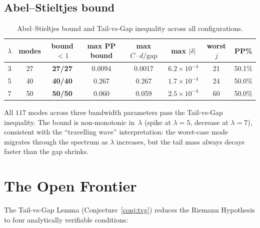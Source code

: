 \documentclass[12pt,a4paper]{article}
\theoremstyle{definition}
\theoremstyle{remark}
\begin{document}
\subsection{Abel--Stieltjes bound}

\begin{table}[h]
\centering
\caption{Abel--Stieltjes bound and Tail-vs-Gap inequality across all
configurations.}
\label{tab:abel}
\begin{tabular}{cccccccc}
\toprule
$\lambda$ & modes & bound $< 1$ & max PP bound & max $C \cdot d / \text{gap}$
  & max $|\delta|$ & worst $j$ & PP\% \\
\midrule
3 & 27 & \textbf{27/27} & 0.0094 & 0.0017 &
  $6.2 \times 10^{-4}$ & 21 & 50.1\% \\
5 & 40 & \textbf{40/40} & 0.267 & 0.267 &
  $1.7 \times 10^{-4}$ & 24 & 50.0\% \\
7 & 50 & \textbf{50/50} & 0.060 & 0.059 &
  $2.5 \times 10^{-4}$ & 60 & 50.0\% \\
\bottomrule
\end{tabular}
\end{table}

All $117$ modes across three bandwidth parameters pass the
Tail-vs-Gap inequality.
The bound is non-monotonic in~$\lambda$ (spike at $\lambda = 5$,
decrease at $\lambda = 7$), consistent with the ``travelling wave''
interpretation: the worst-case mode migrates through the spectrum
as $\lambda$ increases, but the tail mass always decays faster
than the gap shrinks.

\section{The Open Frontier}
\label{sec:frontier}

The Tail-vs-Gap Lemma (Conjecture~\ref{conj:tvg}) reduces the
Riemann Hypothesis to four analytically verifiable conditions:
\end{document}
